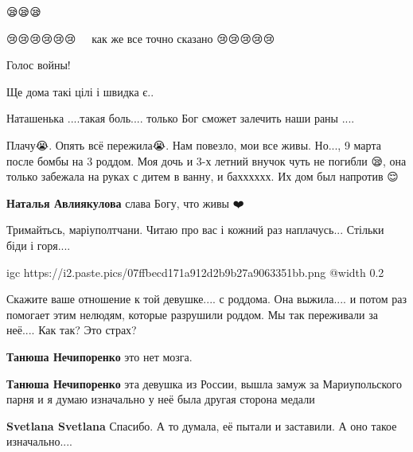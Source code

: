  
 
 
 
 

\qqSecCmt

😪😪😪


😢😢😢😢😢😢🙏🙏🙏🙏🙏как же все точно сказано 😢😢😢😢😢


Голос войны!


Ще дома такі цілі і швидка є..


Наташенька ....такая боль.... только Бог сможет залечить наши раны ....


Плачу😭. Опять всё пережила😭. Нам повезло, мои все живы. Но..., 9 марта после
бомбы на 3 роддом. Моя дочь и 3-х летний внучок чуть не погибли 😪, она только
забежала на руках с дитем в ванну, и бахххххх. Их дом был напротив 😌

\begin{itemize} %
\textbf{Наталья Авлиякулова} слава Богу, что живы ❤️


Тримайтьсь, маріуполтчани. Читаю про вас і кожний раз наплачусь... Стільки біди і горя....
\end{itemize} %


\ifcmt
  igc https://i2.paste.pics/07ffbecd171a912d2b9b27a9063351bb.png
	@width 0.2
\fi


Скажите ваше отношение к той девушке.... с роддома. Она выжила.... и потом раз
помогает этим нелюдям, которые разрушили роддом. Мы так переживали за неё.... Как
так? Это страх?

\begin{itemize} %
\textbf{Танюша Нечипоренко} это нет мозга.

\textbf{Танюша Нечипоренко} эта девушка из России, вышла замуж за Мариупольского парня и я думаю изначально у неё была другая сторона медали

\textbf{Svetlana Svetlana} Спасибо. А то думала, её пытали и заставили. А оно такое изначально....
\end{itemize} %

